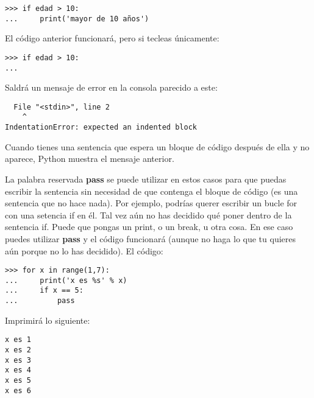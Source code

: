 \begin{listing}
\begin{verbatim}
>>> if edad > 10:
...     print('mayor de 10 años')
\end{verbatim}
\end{listing}

\noindent
El código anterior funcionará, pero si tecleas únicamente:

\begin{listingignore}
\begin{verbatim}
>>> if edad > 10:
...
\end{verbatim}
\end{listingignore}

\noindent
Saldrá un mensaje de error en la consola parecido a este:

\begin{listingignore}
\begin{verbatim}
  File "<stdin>", line 2
    ^
IndentationError: expected an indented block
\end{verbatim}
\end{listingignore}

Cuando tienes una sentencia que espera un bloque de código después de ella y no aparece, Python muestra el mensaje anterior.
\par
La palabra reservada \textbf{pass} se puede utilizar en estos casos para que puedas escribir la sentencia sin necesidad de que contenga el bloque de código (es una sentencia que no hace nada).  Por ejemplo, podrías querer escribir un bucle for con una setencia if en él. Tal vez aún no has decidido qué poner dentro de la sentencia if.  Puede que pongas un print, o un break, u otra cosa.  En ese caso puedes utilizar \textbf{pass} y el código funcionará (aunque no haga lo que tu quieres aún porque no lo has decidido).   El código:

\begin{listing}
\begin{verbatim}
>>> for x in range(1,7):
...     print('x es %s' % x)
...     if x == 5:
...         pass
\end{verbatim}
\end{listing}

\noindent
Imprimirá lo siguiente:

\begin{listing}
\begin{verbatim}
x es 1
x es 2
x es 3
x es 4
x es 5
x es 6
\end{verbatim}
\end{listing}

